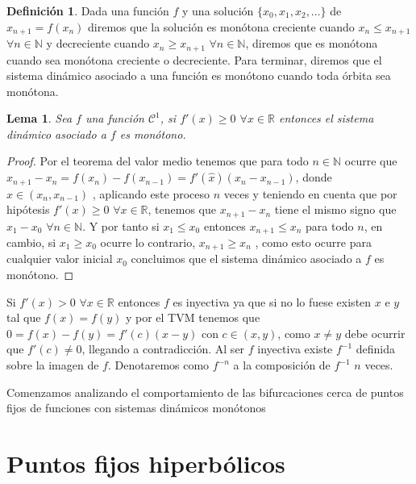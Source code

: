 \documentclass[12pt,a4paper]{report}
\newtheorem{lema}{Lema}[section]
\theoremstyle{definition}
\newtheorem{definicion}{Definición}[section]
\begin{document}
\begin{definicion}
Dada una función $f$ y una solución $\{x_0,x_1,x_2 , \ldots\} $ de $x_{n+1} = f(x_n)$ diremos que la solución es monótona creciente cuando $x_n \leq x_{n+1}$ $\forall n \in \mathbb{N}$ y decreciente cuando $x_n \geq x_{n+1}$ $\forall n \in \mathbb{N}$, diremos que es monótona cuando sea monótona creciente o decreciente. Para terminar, diremos que el sistema dinámico asociado a una función es monótono cuando toda órbita sea monótona. 
\end{definicion}

\begin{lema}

Sea $f$ una función $\mathcal{C}^1$, si $f'(x) \geq 0$ $\forall x \in \mathbb{R}$ entonces el sistema dinámico asociado a $f$ es monótono.
    
\end{lema}

\begin{proof}

Por el teorema del valor medio tenemos que para todo $n \in \mathbb{N}$ ocurre que $x_{n+1} - x_n = f(x_n) - f(x_{n-1}) = f'(\hat{x}) (x_{n} - x_{n-1})$, donde $\hat{x} \in (x_{n}, x_{n-1})$
, aplicando este proceso $n$ veces y teniendo en cuenta que por hipótesis $f'(x) \geq 0$ $\forall x \in \mathbb{R}$, tenemos que $x_{n+1} - x_{n}$ tiene el mismo signo que $x_{1} - x_{0}$ $\forall n \in \mathbb{N}$. Y por tanto si $x_1 \leq x_0$ entonces $x_{n+1} \leq x_n$ para todo $n$, en cambio, si $x_1 \geq x_0$ ocurre lo contrario, $x_{n+1} \geq x_n$ , como esto ocurre para cualquier valor inicial $x_0$ concluimos que el sistema dinámico asociado a $f$ es monótono.

\end{proof}

Si $f'(x) > 0$ $\forall x \in \mathbb{R}$ entonces $f$ es inyectiva ya que si no lo fuese existen $x$ e $y$ tal que $f(x) = f(y)$ y por el TVM tenemos que $0 = f(x) - f(y) = f'(c) (x - y)$ con $c \in (x,y)$, como $x \neq y$ debe ocurrir que $f'(c) \neq 0$, llegando a contradicción.
Al ser $f$ inyectiva existe $f^{-1}$ definida sobre la imagen de $f$. Denotaremos como $f^{-n}$ a la composición de $f^{-1}$ $n$ veces.

Comenzamos analizando el comportamiento de las bifurcaciones cerca de puntos fijos de funciones con sistemas dinámicos monótonos

\section{Puntos fijos hiperbólicos}
\end{document}
